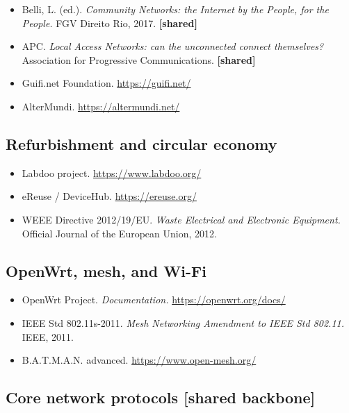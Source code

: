 \begin{itemize}
\tightlist
\item
  Belli, L. (ed.). \emph{Community Networks: the Internet by the People,
  for the People.} FGV Direito Rio, 2017. \textbf{{[}shared{]}}
\item
  APC. \emph{Local Access Networks: can the unconnected connect
  themselves?} Association for Progressive Communications.
  \textbf{{[}shared{]}}
\item
  Guifi.net Foundation. \url{https://guifi.net/}
\item
  AlterMundi. \url{https://altermundi.net/}
\end{itemize}

\hypertarget{refurbishment-and-circular-economy}{%
\subsection{Refurbishment and circular
economy}\label{refurbishment-and-circular-economy}}

\begin{itemize}
\tightlist
\item
  Labdoo project. \url{https://www.labdoo.org/}
\item
  eReuse / DeviceHub. \url{https://ereuse.org/}
\item
  WEEE Directive 2012/19/EU. \emph{Waste Electrical and Electronic
  Equipment.} Official Journal of the European Union, 2012.
\end{itemize}

\hypertarget{openwrt-mesh-and-wi-fi}{%
\subsection{OpenWrt, mesh, and Wi-Fi}\label{openwrt-mesh-and-wi-fi}}

\begin{itemize}
\tightlist
\item
  OpenWrt Project. \emph{Documentation.} \url{https://openwrt.org/docs/}
\item
  IEEE Std 802.11s-2011. \emph{Mesh Networking Amendment to IEEE Std
  802.11.} IEEE, 2011.
\item
  B.A.T.M.A.N. advanced. \url{https://www.open-mesh.org/}
\end{itemize}

\hypertarget{core-network-protocols-shared-backbone}{%
\subsection{Core network protocols {[}shared
backbone{]}}\label{core-network-protocols-shared-backbone}}

